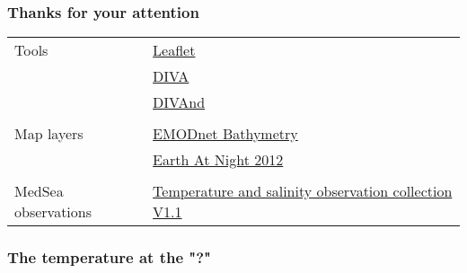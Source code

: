 

\begin{frame}
\frametitle{Thanks for your attention}
\begin{table}[c]
\centering
\begin{tabular}{R{4cm}|L{4cm}}
Tools 					& \href{http://leafletjs.com/}{Leaflet}							\\
						& \href{https://github.com/gher-ulg/DIVA}{DIVA}					\\
						& \href{https://github.com/gher-ulg/divand.jl}	{DIVAnd}			\\
						& \\
Map layers 				& \href{http://www.emodnet-bathymetry.eu/}{EMODnet Bathymetry}	\\
						& \href{https://earthdata.nasa.gov}{Earth At Night 2012}			\\	
						& \\				
MedSea observations		& \href{http://sextant.ifremer.fr/record/cd552057-b604-4004-b838-a4f73cc98fcf/}{Temperature and salinity observation collection V1.1}\\


\end{tabular}
\end{table}
\end{frame}

\begin{frame}[b]
\frametitle{The temperature at the "?"}



\end{frame}



